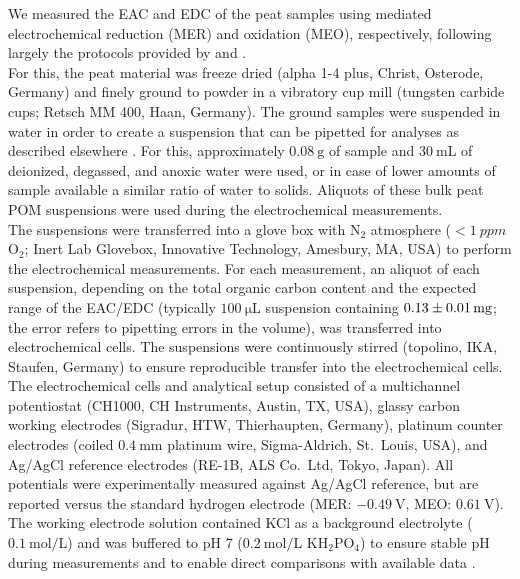 \documentclass[draft,linenumbers]{agujournal2018}
\begin{document}
We measured the EAC and EDC of the peat samples using mediated
electrochemical reduction (MER) and oxidation (MEO), respectively,
following largely the protocols provided by \citet{Lau.2015} and
\citet{Gao.2019}.\\
For this, the peat material was freeze dried (alpha 1-4 plus, Christ,
Osterode, Germany) and finely ground to powder in a vibratory cup mill
(tungsten carbide cups; Retsch MM 400, Haan, Germany). The ground
samples were suspended in water in order to create a suspension that can
be pipetted for analyses as described elsewhere \citep{Lau.2015}. For
this, approximately \(\SI{0.08}{\g}\) of sample and
\(\SI{30}{\milli\L}\) of deionized, degassed, and anoxic water were
used, or in case of lower amounts of sample available a similar ratio of
water to solids. Aliquots of these bulk peat POM suspensions were used
during the electrochemical measurements.\\
The suspensions were transferred into a glove box with N\(_2\)
atmosphere (\(<\SI{1}{ppm}\) O\(_2\); Inert Lab Glovebox, Innovative
Technology, Amesbury, MA, USA) to perform the electrochemical
measurements. For each measurement, an aliquot of each suspension,
depending on the total organic carbon content and the expected range of
the EAC/EDC (typically \(\SI{100}{\micro\L}\) suspension containing
\(\SI[separate-uncertainty=true, multi-part-units = single]{0.13 \pm 0.01}{\milli\g}\);
the error refers to pipetting errors in the volume), was transferred
into electrochemical cells. The suspensions were continuously stirred
(topolino, IKA, Staufen, Germany) to ensure reproducible transfer into
the electrochemical cells.\\
The electrochemical cells and analytical setup consisted of a
multichannel potentiostat (CH1000, CH Instruments, Austin, TX, USA),
glassy carbon working electrodes (Sigradur, HTW, Thierhaupten, Germany),
platinum counter electrodes (coiled \(\SI{0.4}{\milli\m}\) platinum
wire, Sigma-Aldrich, St.~Louis, USA), and Ag/AgCl reference electrodes
(RE-1B, ALS Co.~Ltd, Tokyo, Japan). All potentials were experimentally
measured against Ag/AgCl reference, but are reported versus the standard
hydrogen electrode (MER: \(\SI{-0.49}{\V}\), MEO: \(\SI{+0.61}{\V}\)).\\
The working electrode solution contained KCl as a background electrolyte
(\(\SI{0.1}{\mol\per\L}\)) and was buffered to pH 7
(\(\SI{0.2}{\mol\per\L}\) KH\(_2\)PO\(_4\)) to ensure stable pH during
measurements \citep{Aeschbacher.2011} and to enable direct comparisons
with available data \citep{Aeschbacher.2010, Walpen.2018, Tan.2017}.
\end{document}
